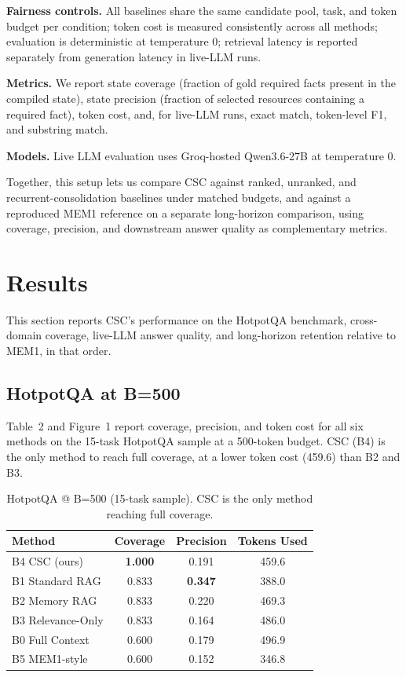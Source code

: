 \documentclass{article}
\begin{document}
\textbf{Fairness controls.} All baselines share the same candidate pool, task, and token budget per condition; token cost is measured consistently across all methods; evaluation is deterministic at temperature 0; retrieval latency is reported separately from generation latency in live-LLM runs.

\textbf{Metrics.} We report state coverage (fraction of gold required facts present in the compiled state), state precision (fraction of selected resources containing a required fact), token cost, and, for live-LLM runs, exact match, token-level F1, and substring match.

\textbf{Models.} Live LLM evaluation uses Groq-hosted Qwen3.6-27B at temperature 0.

Together, this setup lets us compare CSC against ranked, unranked, and recurrent-consolidation baselines under matched budgets, and against a reproduced MEM1 reference on a separate long-horizon comparison, using coverage, precision, and downstream answer quality as complementary metrics.

\section{Results}

This section reports CSC's performance on the HotpotQA benchmark, cross-domain coverage, live-LLM answer quality, and long-horizon retention relative to MEM1, in that order.

\subsection{HotpotQA at B=500}

Table~2 and Figure~1 report coverage, precision, and token cost for all six methods on the 15-task HotpotQA sample at a 500-token budget. CSC (B4) is the only method to reach full coverage, at a lower token cost (459.6) than B2 and B3.

\begin{table}[t]
\caption{HotpotQA @ B=500 (15-task sample). CSC is the only method reaching full coverage.}
\centering
\begin{tabular}{lccc}
\toprule
Method & Coverage & Precision & Tokens Used \\
\midrule
B4 CSC (ours) & \textbf{1.000} & 0.191 & 459.6 \\
B1 Standard RAG & 0.833 & \textbf{0.347} & 388.0 \\
B2 Memory RAG & 0.833 & 0.220 & 469.3 \\
B3 Relevance-Only & 0.833 & 0.164 & 486.0 \\
B0 Full Context & 0.600 & 0.179 & 496.9 \\
B5 MEM1-style & 0.600 & 0.152 & 346.8 \\
\bottomrule
\end{tabular}
\end{table}
\end{document}
